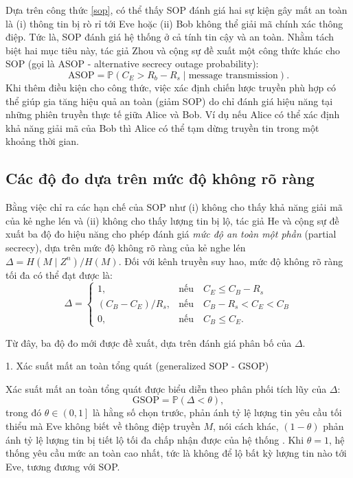 \documentclass[../main.tex]{subfiles}
\begin{document}
Dựa trên công thức \eqref{sop}, có thể thấy SOP đánh giá hai sự kiện gây mất an toàn là (i) thông tin bị rò rỉ tới Eve hoặc (ii) Bob không thể giải mã chính xác thông điệp. Tức là, SOP đánh giá hệ thống ở cả tính tin cậy và an toàn. Nhằm tách biệt hai mục tiêu này, tác giả Zhou và cộng sự \cite{zhou2011} đề xuất một công thức khác cho SOP (gọi là ASOP - alternative secrecy outage probability):
\begin{equation}\label{asop}
    \text{ASOP} = \mathbb{P}\left(C_E > R_b - R_s \mid \text{message transmission}\right).
\end{equation}
Khi thêm điều kiện cho công thức, việc xác định chiến lược truyền phù hợp có thể giúp gia tăng hiệu quả an toàn (giảm SOP) do chỉ đánh giá hiệu năng tại những phiên truyền thực tế giữa Alice và Bob. Ví dụ nếu Alice có thể xác định khả năng giải mã của Bob thì Alice có thể tạm dừng truyền tin trong một khoảng thời gian.

\subsection{Các độ đo dựa trên mức độ không rõ ràng}

Bằng việc chỉ ra các hạn chế của SOP như (i) không cho thấy khả năng giải mã của kẻ nghe lén và (ii) không cho thấy lượng tin bị lộ, tác giả He và cộng sự \cite{he2016secrecy} đề xuất ba độ đo hiệu năng cho phép đánh giá \textit{mức độ an toàn một phần} (partial secrecy), dựa trên mức độ không rõ ràng của kẻ nghe lén $\Delta = H(M \mid Z^n)/H(M)$. Đối với kênh truyền suy hao, mức độ không rõ ràng tối đa có thể đạt được là:
\begin{equation}\label{delta}
    \Delta= 
\begin{cases}
    1,& \text{nếu} \quad C_E\leq C_B - R_s\\
    \left(C_B - C_E\right)/R_s,& \text{nếu} \quad C_B - R_s < C_E < C_B\\
    0              ,& \text{nếu} \quad C_B \leq C_E.
\end{cases}
\end{equation}

Từ đây, ba độ đo mới được đề xuất, dựa trên đánh giá phân bố của $\Delta$.

1. Xác suất mất an toàn tổng quát (generalized SOP - GSOP)

Xác suất mất an toàn tổng quát được biểu diễn theo phân phối tích lũy của $\Delta$:
\begin{equation}\label{gsop}
    \text{GSOP} = \mathbb{P}(\Delta < \theta),
\end{equation}
trong đó $\theta \in \left(0, 1\right]$ là hằng số chọn trước, phản ánh tỷ lệ lượng tin yêu cầu tối thiểu mà Eve không biết về thông điệp truyền $M$, nói cách khác, $\left(1 - \theta\right)$ phản ánh tỷ lệ lượng tin bị tiết lộ tối đa chấp nhận được của hệ thống \cite{he2016secrecy}. Khi $\theta = 1$, hệ thống yêu cầu mức an toàn cao nhất, tức là không để lộ bất kỳ lượng tin nào tới Eve, tương đương với SOP.
\end{document}
